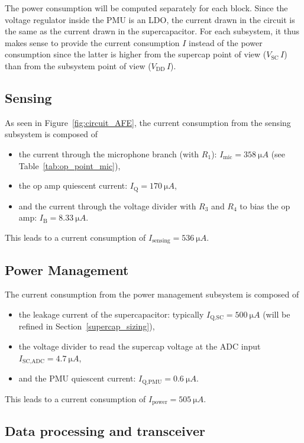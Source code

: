 \documentclass{EPL-master-thesis-covers-EN}
\newcommand{\te}[1]{\textrm{#1}}
\begin{document}
The power consumption will be computed separately for each block. Since the voltage regulator inside the PMU is an LDO, the current drawn in the circuit is the same as the current drawn in the supercapacitor. For each subsystem, it thus makes sense to provide the current consumption $I$ instead of the power consumption since the latter is higher from the supercap point of view ($V_\te{SC}\,I$) than from the subsystem point of view ($V_\te{DD}\,I$).


\subsection*{Sensing}

As seen in Figure~\ref{fig:circuit_AFE}, the current consumption from the sensing subsystem is composed of
\begin{itemize}
 \item the current through the microphone branch (with $R_1$): $I_{\te{mic}} = \SI{358}{\micro A}$ (see Table~\ref{tab:op_point_mic}),
 \item the op amp quiescent current: $I_\te{Q} = \SI{170}{\micro A}$,
 \item and the current through the voltage divider with $R_3$ and $R_4$ to bias the op amp: $I_\te{B} = \SI{8.33}{\micro A}$.
\end{itemize}

This leads to a current consumption of $I_\te{sensing} = \SI{536}{\micro A}$.

\subsection*{Power Management}

The current consumption from the power management subsystem is composed of
\begin{itemize}
 \item the leakage current of the supercapacitor: typically $I_\te{Q,SC} = \SI{500}{\micro A}$ (will be refined in Section~\ref{supercap_sizing}),
 \item the voltage divider to read the supercap voltage at the ADC input $I_\te{SC,ADC} = \SI{4.7}{\micro A}$,
 \item and the PMU quiescent current: $I_\te{Q,PMU} = \SI{0.6}{\micro A}$.
\end{itemize}

This leads to a current consumption of $I_\te{power} = \SI{505}{\micro A}$.


\subsection*{Data processing and transceiver}
\end{document}
